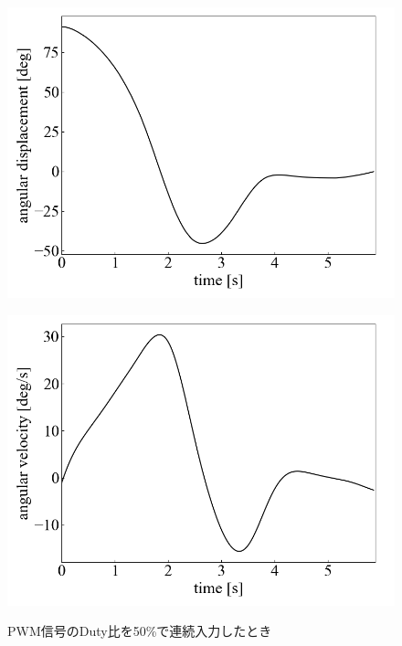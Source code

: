 \begin{figure}[h]
	\centering
	\begin{minipage}{0.43\columnwidth}
	  \centering
	  \includegraphics[width=\columnwidth]{./figure/duty50deg.png}
	  \label{fig:duty50deg}
	\end{minipage}
	\hspace{5mm}
	\begin{minipage}{0.43\columnwidth}
	  \centering
	  \includegraphics[width=\columnwidth]{./figure/duty50degpers.png}
	  \label{fig:duty50degpers}
	\end{minipage}
	\caption{PWM信号のDuty比を50\%で連続入力したとき}
  \end{figure}

